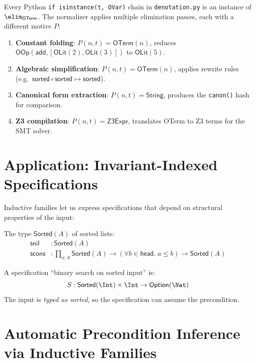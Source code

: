 \begin{proposition}[Pattern Matching = Elimination]
\label{prop:pattern-elim}
Every Python \texttt{if isinstance(t, OVar)} chain in
\texttt{denotation.py} is an instance of $\elim_{\mathsf{OTerm}}$.
The normalizer applies multiple elimination passes, each with a
different motive $P$:
\begin{enumerate}
  \item \textbf{Constant folding}: $P(n,t) = \mathsf{OTerm}(n)$,
    reduces $\mathsf{OOp}(\mathsf{add}, [\mathsf{OLit}(2),
    \mathsf{OLit}(3)])$ to $\mathsf{OLit}(5)$.
  \item \textbf{Algebraic simplification}: $P(n,t) = \mathsf{OTerm}(n)$,
    applies rewrite rules (e.g.\ $\mathsf{sorted} \circ \mathsf{sorted}
    \mapsto \mathsf{sorted}$).
  \item \textbf{Canonical form extraction}: $P(n,t) = \mathsf{String}$,
    produces the \texttt{canon()} hash for comparison.
  \item \textbf{Z3 compilation}: $P(n,t) = \mathsf{Z3Expr}$,
    translates OTerm to Z3 terms for the SMT solver.
\end{enumerate}
\end{proposition}

\section{Application: Invariant-Indexed Specifications}

Inductive families let us express specifications that depend on
structural properties of the input:

\begin{definition}
The type $\mathsf{Sorted}(A)$ of sorted lists:
\begin{align}
  \mathsf{snil} &: \mathsf{Sorted}(A) \\
  \mathsf{scons} &: \prod_{a : A} \mathsf{Sorted}(A) \to
    (\forall b \in \mathsf{head}.\; a \leq b) \to
    \mathsf{Sorted}(A)
\end{align}

A specification ``binary search on sorted input'' is:
\[
  S : \mathsf{Sorted}(\Int) \times \Int \to \mathsf{Option}(\Nat)
\]
The input is \emph{typed as sorted}, so the specification can assume
the precondition.
\end{definition}

\section{Automatic Precondition Inference via Inductive Families}

